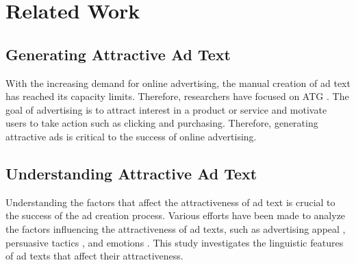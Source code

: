 \section{Related Work}
\subsection{Generating Attractive Ad Text\label{sec:related_work_atg}}
With the increasing demand for online advertising, the manual creation of ad text has reached its capacity limits. 
Therefore, researchers have focused on ATG \cite{murakami2023atgsurvey}.
The goal of advertising is to attract interest in a product or service and motivate users to take action such as clicking and purchasing. 
Therefore, generating attractive ads is critical to the success of online advertising.


\subsection{Understanding Attractive Ad Text}
Understanding the factors that affect the attractiveness of ad text is crucial to the success of the ad creation process. 
Various efforts have been made to analyze the factors influencing the attractiveness of ad texts, such as advertising appeal \cite{murakami-etal-2022-aspect}, persuasive tactics \cite{yuan2023persuadetoclick}, and emotions \cite{youngmann2020}. 
This study investigates the linguistic features of ad texts that affect their attractiveness.


